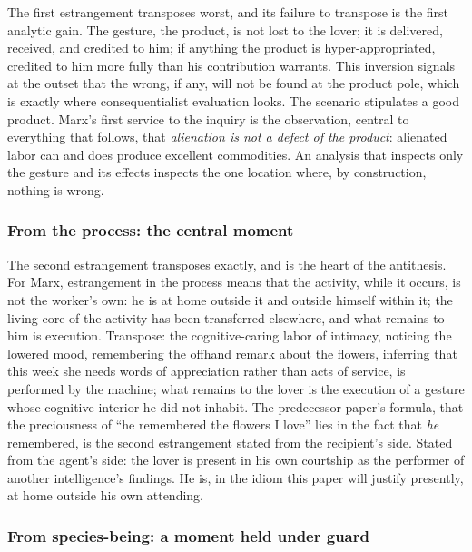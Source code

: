 \documentclass[11pt,a4paper]{article}
\newcommand{\term}[1]{\textit{\textcolor{pinkitalic}{#1}}}
\begin{document}
The first estrangement transposes worst, and its failure to transpose is the first analytic gain. The gesture, the product, is not lost to the lover; it is delivered, received, and credited to him; if anything the product is hyper-appropriated, credited to him more fully than his contribution warrants. This inversion signals at the outset that the wrong, if any, will not be found at the product pole, which is exactly where consequentialist evaluation looks. The scenario stipulates a good product. Marx's first service to the inquiry is the observation, central to everything that follows, that \term{alienation is not a defect of the product}: alienated labor can and does produce excellent commodities. An analysis that inspects only the gesture and its effects inspects the one location where, by construction, nothing is wrong.

\subsubsection{From the process: the central moment}
\label{p02:sec:marx-process}

The second estrangement transposes exactly, and is the heart of the antithesis. For Marx, estrangement in the process means that the activity, while it occurs, is not the worker's own: he is at home outside it and outside himself within it; the living core of the activity has been transferred elsewhere, and what remains to him is execution. Transpose: the cognitive-caring labor of intimacy, noticing the lowered mood, remembering the offhand remark about the flowers, inferring that this week she needs words of appreciation rather than acts of service, is performed by the machine; what remains to the lover is the execution of a gesture whose cognitive interior he did not inhabit. The predecessor paper's formula, that the preciousness of ``he remembered the flowers I love'' lies in the fact that \emph{he} remembered, is the second estrangement stated from the recipient's side. Stated from the agent's side: the lover is present in his own courtship as the performer of another intelligence's findings. He is, in the idiom this paper will justify presently, at home outside his own attending.

\subsubsection{From species-being: a moment held under guard}
\label{p02:sec:marx-species}
\end{document}
